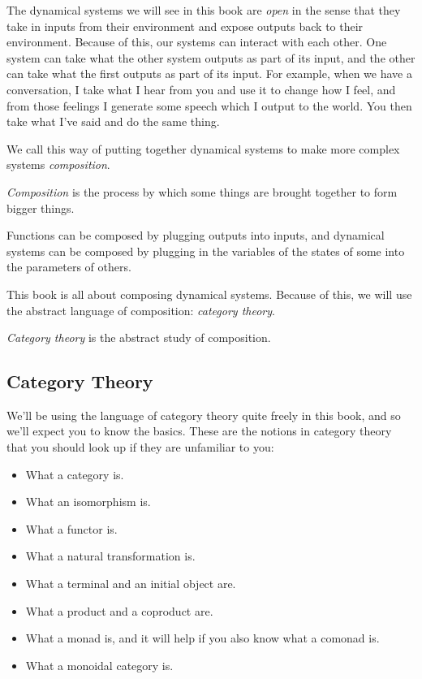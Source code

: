\documentclass[DynamicalBook]{subfiles}
\begin{document}
The dynamical systems we will see in this book are \emph{open} in the sense that
they take in inputs from their environment and expose outputs back to their
environment. Because of this, our systems can interact with each other. One
system can take what the other system outputs as part of its input, and the
other can take what the first outputs as part of its input. For example, when we
have a conversation, I take what I hear from you and use it to change how I
feel, and from those feelings I generate some speech which I output to the
world. You then take what I've said and do the same thing.

\begin{center}
\end{center}

We call this way of putting together dynamical systems to make more complex
systems \emph{composition}.
\begin{informal}
  \emph{Composition} is the process by which some things are brought together to
  form bigger things.
\end{informal}

Functions can be composed by plugging outputs into inputs, and dynamical systems
can be composed by plugging in the variables of the states of some into the
parameters of others.
  
This book is all about composing dynamical systems. Because of this, we will use
the abstract language of composition: \emph{category theory}.
\begin{informal}
\emph{Category theory} is the abstract study of composition.
\end{informal}




\subsection{Category Theory}\label{sec:category.theory}

We'll be using the language of category theory quite freely in this book, and so
we'll expect you to know the basics. These are the notions in category theory that you should look up if they are unfamiliar to you:
\begin{itemize}
\item What a category is.
\item What an isomorphism is.
\item What a functor is.
\item What a natural transformation is.
\item What a terminal and an initial object are.
\item What a product and a coproduct are.
\item What a monad is, and it will help if you also know what a comonad is.
  \item What a monoidal category is.
\end{itemize}
\end{document}
